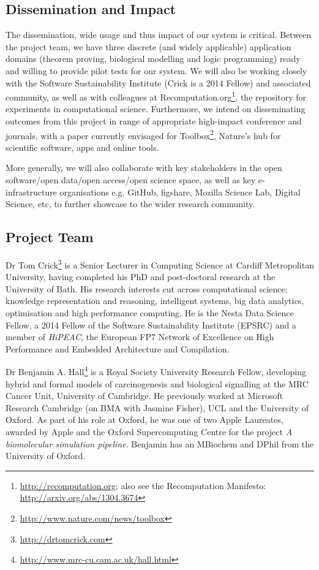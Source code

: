 \documentclass[a4paper,10pt]{article}
\begin{document}
\subsection*{Dissemination and Impact}

The dissemination, wide usage and thus impact of our system is
critical. Between the project team, we have three discrete (and widely
applicable) application domains (theorem proving, biological modelling
and logic programming) ready and willing to provide pilot tests for
our system. We will also be working closely with the Software
Sustainability Institute (Crick is a 2014 Fellow) and associated
community, as well as with colleagues at
Recomputation.org\footnote{\url{http://recomputation.org}; also see
the Recomputation Manifesto: \url{http://arxiv.org/abs/1304.3674}},
the repository for experiments in computational science. Furthermore,
we intend on disseminating outcomes from this project in range of
appropriate high-impact conference and journals, with a paper
currently envisaged for
Toolbox\footnote{\url{http://www.nature.com/news/toolbox}}, Nature's
hub for scientific software, apps and online tools.

More generally, we will also collaborate with key stakeholders in the
open software/open data/open access/open science space, as well as key
e-infrastructure organisations e.g. GitHub, figshare, Mozilla Science
Lab, Digital Science, etc, to further showcase to the wider research
community.

\subsection*{Project Team}

Dr Tom Crick\footnote{\url{http://drtomcrick.com}} is a Senior Lecturer in
Computing Science at Cardiff Metropolitan University, having completed
his PhD and post-doctoral research at the University of Bath. His
research interests cut across computational science: knowledge
representation and reasoning, intelligent systems, big data analytics,
optimisation and high performance computing.  He is the Nesta Data
Science Fellow, a 2014 Fellow of the Software Sustainability Institute
(EPSRC) and a member of {\emph{HiPEAC}}, the European FP7 Network of
Excellence on High Performance and Embedded Architecture and
Compilation.

Dr Benjamin A. Hall\footnote{\url{http://www.mrc-cu.cam.ac.uk/hall.html}} is a
Royal Society University Research Fellow, developing hybrid and formal
models of carcinogenesis and biological signalling at the MRC Cancer
Unit, University of Cambridge. He previously worked at Microsoft
Research Cambridge (on BMA with Jasmine Fisher), UCL and the
University of Oxford. As part of his role at Oxford, he was one of two
Apple Laureates, awarded by Apple and the Oxford Supercomputing Centre
for the project {\emph{A biomolecular simulation pipeline}}. Benjamin
has an MBiochem and DPhil from the University of Oxford.
\end{document}
